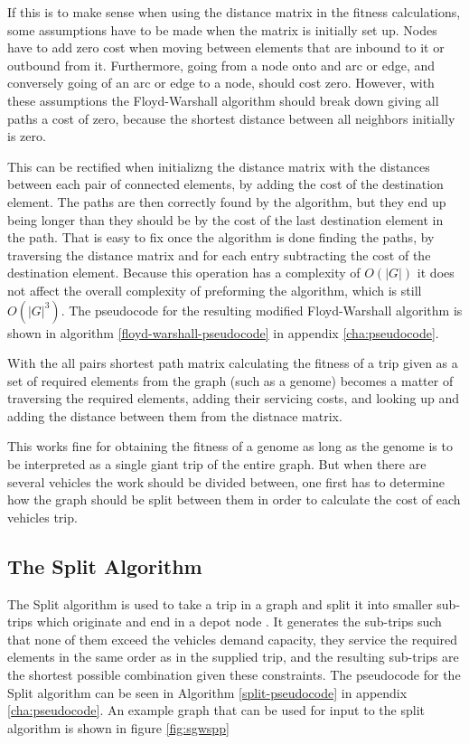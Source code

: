 If this is to make sense when using the distance matrix in the fitness calculations, some assumptions have to be made when the matrix is initially set up. Nodes have to add zero cost when moving between elements that are inbound to it or outbound from it. Furthermore, going from a node onto and arc or edge, and conversely going of an arc or edge to a node, should cost zero. However, with these assumptions the Floyd-Warshall algorithm should break down giving all paths a cost of zero, because the shortest distance between all neighbors initially is zero.

This can be rectified when initializng the distance matrix with the distances between each pair of connected elements, by adding the cost of the destination element. The paths are then correctly found by the algorithm, but they end up being longer than they should be by the cost of the last destination element in the path. That is easy to fix once the algorithm is done finding the paths, by traversing the distance matrix and for each entry subtracting the cost of the destination element. Because this operation has a complexity of $O(|G|)$ it does not affect the overall complexity of preforming the algorithm, which is still $O(|G|^3)$. The pseudocode for the resulting modified Floyd-Warshall algorithm is shown in algorithm \ref{floyd-warshall-pseudocode} in appendix \ref{cha:pseudocode}.



With the all pairs shortest path matrix calculating the fitness of a trip given as a set of required elements from the graph (such as a genome) becomes a matter of traversing the required elements, adding their servicing costs, and looking up and adding the distance between them from the distnace matrix.

This works fine for obtaining the fitness of a genome as long as the genome is to be interpreted as a single giant trip of the entire graph. But when there are several vehicles the work should be divided between, one first has to determine how the graph should be split between them in order to calculate the cost of each vehicles trip.


\subsection{The Split Algorithm} %
\label{sub:the_split_algorithm}

The Split algorithm is used to take a trip in a graph and split it into smaller sub-trips which originate and end in a depot node \citep{ulusoy1985CARP}. It generates the sub-trips such that none of them exceed the vehicles demand capacity, they service the required elements in the same order as in the supplied trip, and the resulting sub-trips are the shortest possible combination given these constraints. The pseudocode for the Split algorithm can be seen in Algorithm \ref{split-pseudocode} in appendix \ref{cha:pseudocode}. An example graph that can be used for input to the split algorithm is shown in figure \ref{fig:sgwspp}

